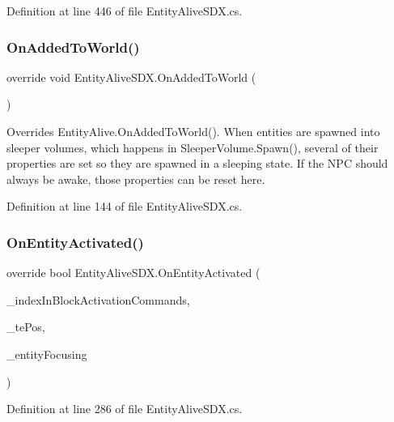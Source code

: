 Definition at line 446 of file Entity\+Alive\+S\+D\+X.\+cs.

\mbox{\label{class_entity_alive_s_d_x_ac76f63080e7882372bb47c3fc531112a}} 
\subsubsection{\texorpdfstring{OnAddedToWorld()}{OnAddedToWorld()}}
{\footnotesize\ttfamily override void Entity\+Alive\+S\+D\+X.\+On\+Added\+To\+World (\begin{DoxyParamCaption}{ }\end{DoxyParamCaption})}



Overrides Entity\+Alive.\+On\+Added\+To\+World(). When entities are spawned into sleeper volumes, which happens in Sleeper\+Volume.\+Spawn(), several of their properties are set so they are spawned in a sleeping state. If the N\+PC should always be awake, those properties can be reset here. 



Definition at line 144 of file Entity\+Alive\+S\+D\+X.\+cs.

\mbox{\label{class_entity_alive_s_d_x_a146b9caa2af4c7a13992bd57a389cf4a}} 
\subsubsection{\texorpdfstring{OnEntityActivated()}{OnEntityActivated()}}
{\footnotesize\ttfamily override bool Entity\+Alive\+S\+D\+X.\+On\+Entity\+Activated (\begin{DoxyParamCaption}\item[{int}]{\+\_\+index\+In\+Block\+Activation\+Commands,  }\item[{Vector3i}]{\+\_\+te\+Pos,  }\item[{Entity\+Alive}]{\+\_\+entity\+Focusing }\end{DoxyParamCaption})}



Definition at line 286 of file Entity\+Alive\+S\+D\+X.\+cs.

\mbox{\label{class_entity_alive_s_d_x_a3d648f69f76ad883dd30cca625d02bda}} 
